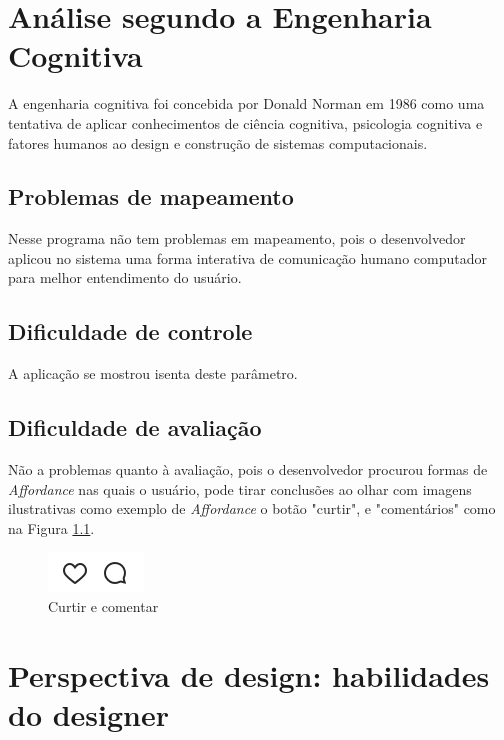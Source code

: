 \documentclass[
	12pt,				%
	openright,			%
	oneside,			%
	a4paper,			%
	english,			%
	french,				%
	spanish,			%
	brazil,				%
	]{abntex2}
\begin{document}
\chapter{Análise segundo a Engenharia Cognitiva}

A engenharia cognitiva foi concebida por Donald Norman em 1986 como uma tentativa de aplicar conhecimentos de ciência cognitiva, psicologia cognitiva e fatores humanos ao design e construção de sistemas computacionais. 

\section{Problemas de mapeamento}

Nesse programa não tem problemas em mapeamento, pois o desenvolvedor aplicou no sistema uma forma interativa de comunicação humano computador para melhor entendimento do usuário. 

\section{Dificuldade de controle}

A aplicação se mostrou isenta deste parâmetro.

\section{Dificuldade de avaliação}

Não a problemas quanto à avaliação, pois o desenvolvedor procurou formas de \textit{Affordance} nas quais o usuário, pode tirar conclusões ao olhar com imagens ilustrativas como exemplo de \textit{Affordance} o botão "curtir", e "comentários" como na Figura \ref{curtir}.

\begin{figure}[htb]
	\caption{\label{curtir}Curtir e comentar}
	\begin{center}
		\includegraphics[scale=1]{instacurtir.jpg}
	\end{center}
\end{figure}

\chapter{Perspectiva de design: habilidades do designer}
\end{document}
